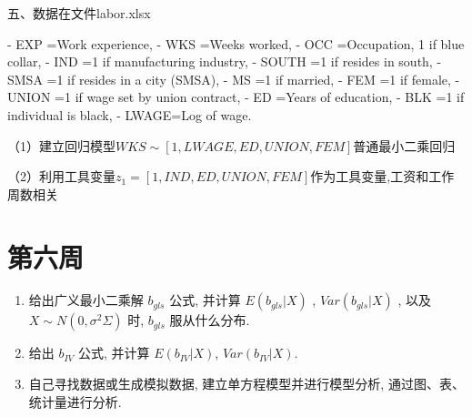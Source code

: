 五、数据在文件labor.xlsx

- EXP =Work experience,
- WKS =Weeks worked,
- OCC =Occupation, 1 if blue collar,
- IND =1 if manufacturing industry,
- SOUTH =1 if resides in south,
- SMSA =1 if resides in a city (SMSA),
- MS =1 if married,
- FEM =1 if female,
- UNION =1 if wage set by union contract,
- ED =Years of education,
- BLK =1 if individual is black,
- LWAGE=Log of wage.

（1）建立回归模型$WKS\sim [1,LWAGE,ED,UNION,FEM]$普通最小二乘回归

（2）利用工具变量$z_1=[1,IND,ED,UNION,FEM]$作为工具变量,工资和工作周数相关

\section{第六周} 

\begin{enumerate}
    \item 给出广义最小二乘解 $b_{gls}$ 公式, 并计算 $E(b_{gls}|X)$ , $Var(b_{gls}|X)$ , 以及 $X\sim N(0,\sigma^{2}\Sigma)$ 时, $b_{gls}$ 服从什么分布.

    \item 给出 $b_{IV}$ 公式, 并计算 $E(b_{IV}|X)$, $Var(b_{IV}|X)$.

    \item 自己寻找数据或生成模拟数据, 建立单方程模型并进行模型分析, 通过图、表、统计量进行分析.
\end{enumerate}

